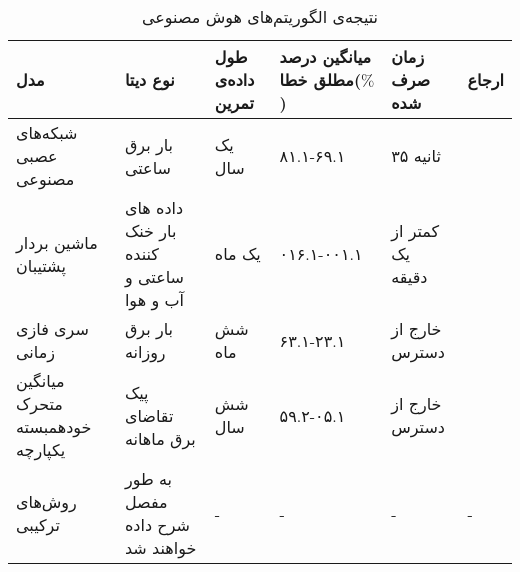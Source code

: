 \begin{table}\label{tb:result}
    \begin{tabular}{ |p{2cm}|p{2cm}|p{2cm}|p{2.4cm}|p{2cm}|p{2cm}|  }
        \hline
        مدل & نوع دیتا  & طول داده‌ی تمرین & میانگین درصد مطلق خطا($\%$)\footnotemark[1] & زمان صرف شده& ارجاع\\
        \hline
        شبکه‌های عصبی مصنوعی& بار برق ساعتی& یک سال & ۸۱.۱-۶۹.۱& ۳۵ ثانیه& \cite{chitsaz2015short}\\
        \hline
        ماشین بردار پشتیبان& داده های بار خنک کننده ساعتی و آب و هوا & یک ماه& ۰۱۶.۱-۰۰۱.۱& کمتر از یک دقیقه& \cite{li2009applying}\\
        \hline
        سری فازی زمانی & بار برق روزانه & شش ماه& ۶۳.۱-۲۳.۱& خارج از دسترس& \cite{efendi2015new}\\
        \hline
        میانگین متحرک خودهمبسته یکپارچه & پیک تقاضای برق ماهانه & شش سال& ۵۹.۲-۰۵.۱ & خارج از دسترس& \cite{rallapalli2012forecasting}\\
        \hline
        روش‌های ترکیبی & به طور مفصل شرح داده خواهند شد & -& - & - & -\\
        \hline
        \end{tabular}
        \caption[نتیجه‌ی الگوریتم‌های هوش‌‌ مصنوعی]{نتیجه‌ی الگوریتم‌های هوش‌‌ مصنوعی}
    \end{table}
    

